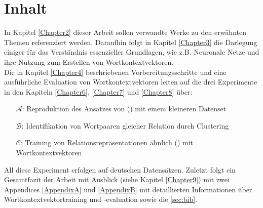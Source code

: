 \section{Inhalt}

In Kapitel \ref{Chapter2} dieser Arbeit sollen verwandte Werke zu den erwähnten Themen referenziert werden.
Daraufhin folgt in Kapitel \ref{Chapter3} die Darlegung einiger für das Verständnis essenzieller Grundlagen, wie z.B.
Neuronale Netze und ihre Nutzung zum Erstellen von Wortkontextvektoren.\\
Die in Kapitel \ref{Chapter4} beschriebenen Vorbereitungsschritte und eine ausführliche Evaluation von Wortkontextvektoren
leiten auf die drei Experimente in den Kapiteln \ref{Chapter6}, \ref{Chapter7} und \ref{Chapter8} über:
\begin{itemize}
  \item[$\mathcal{A}$:] Reproduktion des Ansatzes von (\cite{bordes2013translating}) mit einem kleineren Datenset
  \item[$\mathcal{B}$:] Identifikation von Wortpaaren gleicher Relation durch Clustering
  \item[$\mathcal{C}$:] Training von Relationsrepräsentationen ähnlich (\cite{bordes2013translating}) mit Wortkontextvektoren
\end{itemize}

All diese Experiment erfolgen auf deutschen Datensätzen.
Zuletzt folgt ein Gesamtfazit der Arbeit mit Ausblick (siehe Kapitel \ref{Chapter9}) mit zwei Appendices \ref{AppendixA}
und \ref{AppendixB} mit detaillierten Informationen über Wortkontextvektortraining und -evaluation sowie die
\ref{sec:bib}.
